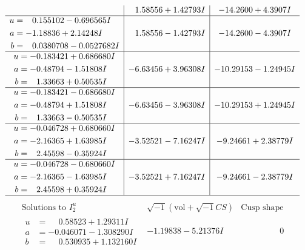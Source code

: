 \documentclass[1p]{elsarticle_modified}
\theoremstyle{definition}
\newcommand{\I}{\sqrt{-1}}
\begin{document}
$$\begin{array}{c|c|c}
 & \phantom{-}1.58556 + 1.42793 I & -14.2600 + 4.3907 I \\ \hline\begin{aligned}
u &= \phantom{-}0.155102 - 0.696565 I \\
a &= -1.18836 + 2.14248 I \\
b &= \phantom{-}0.0380708 - 0.0527682 I\end{aligned}
 & \phantom{-}1.58556 - 1.42793 I & -14.2600 - 4.3907 I \\ \hline\begin{aligned}
u &= -0.183421 + 0.686680 I \\
a &= -0.48794 - 1.51808 I \\
b &= \phantom{-}1.33663 + 0.50535 I\end{aligned}
 & -6.63456 + 3.96308 I & -10.29153 - 1.24945 I \\ \hline\begin{aligned}
u &= -0.183421 - 0.686680 I \\
a &= -0.48794 + 1.51808 I \\
b &= \phantom{-}1.33663 - 0.50535 I\end{aligned}
 & -6.63456 - 3.96308 I & -10.29153 + 1.24945 I \\ \hline\begin{aligned}
u &= -0.046728 + 0.680660 I \\
a &= -2.16365 + 1.63985 I \\
b &= \phantom{-}2.45598 - 0.35924 I\end{aligned}
 & -3.52521 - 7.16247 I & -9.24661 + 2.38779 I \\ \hline\begin{aligned}
u &= -0.046728 - 0.680660 I \\
a &= -2.16365 - 1.63985 I \\
b &= \phantom{-}2.45598 + 0.35924 I\end{aligned}
 & -3.52521 + 7.16247 I & -9.24661 - 2.38779 I\\
 \hline 
 \end{array}$$\newpage$$\begin{array}{c|c|c}  
\text{Solutions to }I^u_{2}& \I (\text{vol} + \sqrt{-1}CS) & \text{Cusp shape}\\
 \hline 
\begin{aligned}
u &= \phantom{-}0.58523 + 1.29311 I \\
a &= -0.046071 - 1.308290 I \\
b &= \phantom{-}0.530935 + 1.132160 I\end{aligned}
 & -1.19838 - 5.21376 I & \phantom{-0.000000 } 0 \\ \hline\begin{aligned}

\end{aligned}
\end{array}$$
\end{document}
